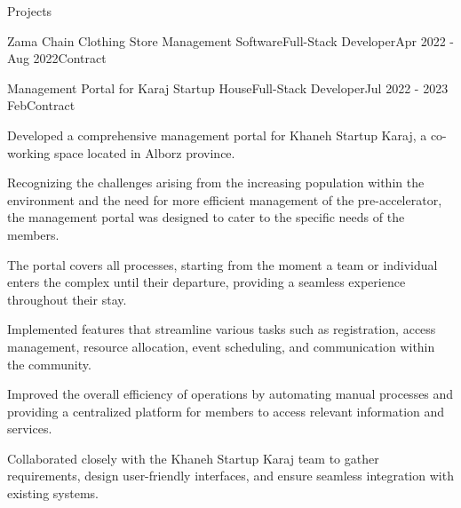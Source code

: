\documentclass[]{kyvernitis-resume}
\begin{document}
\begin{section}{Projects}
\begin{subsection}{Zama Chain Clothing Store Management Software}{Full-Stack Developer}{Apr 2022 - Aug 2022}{Contract}{}
    \end{subsection}

\begin{subsection}{Management Portal for Karaj Startup House}{Full-Stack Developer}{Jul 2022 - 2023 Feb}{Contract}{}
     		\item Developed a comprehensive management portal for Khaneh Startup Karaj, a co-working space located in Alborz province.
		\item Recognizing the challenges arising from the increasing population within the environment and the need for more efficient management of the pre-accelerator, the management portal was designed to cater to the specific needs of the members.
		\item The portal covers all processes, starting from the moment a team or individual enters the complex until their departure, providing a seamless experience throughout their stay.
		\item Implemented features that streamline various tasks such as registration, access management, resource allocation, event scheduling, and communication within the community.
		\item Improved the overall efficiency of operations by automating manual processes and providing a centralized platform for members to access relevant information and services.
		\item Collaborated closely with the Khaneh Startup Karaj team to gather requirements, design user-friendly interfaces, and ensure seamless integration with existing systems.
    \end{subsection}


    
\end{section}




\end{document}
